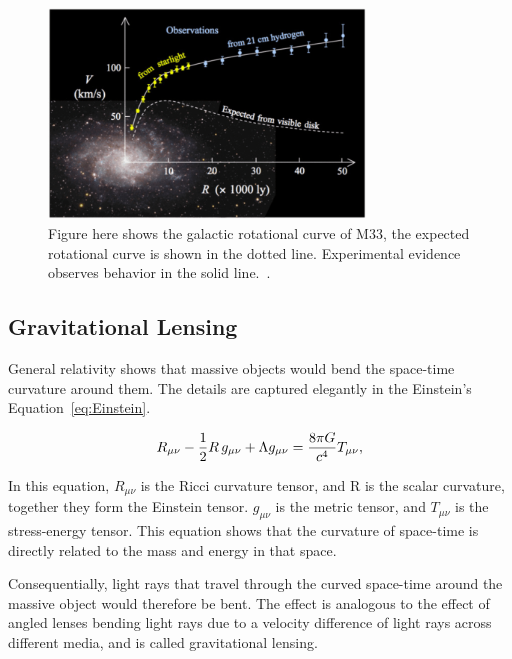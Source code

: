 \begin{figure}[!htb]
    \begin{center}
        \includegraphics[width=0.75\textwidth]{figures/chapter_DM/M33-rotation-curve}
        \caption{
            Figure here shows the galactic rotational curve of M33, the expected rotational curve is shown in the dotted line. Experimental evidence observes behavior in the solid line.~\cite{M33}.
        }
        \label{fig:M33_figure}
    \end{center}
\end{figure}

\subsection{Gravitational Lensing}
General relativity shows that massive objects would bend the space-time curvature around them. The details are captured elegantly in the Einstein's Equation~\ref{eq:Einstein}. 

\begin{equation}
	R_{\mu \nu} - {1 \over 2}R \, g_{\mu \nu} + \Lambda g_{\mu \nu}= {8 \pi G \over c^4} T_{\mu \nu}, 
    \label{eq:Einstein}
\end{equation}

	In this equation, $R_{\mu \nu}$ is the Ricci curvature tensor, and R is the scalar curvature, together they form the Einstein tensor. $g_{\mu \nu}$ is the metric tensor, and $T_{\mu \nu}$ is the stress-energy tensor. This equation shows that the curvature of space-time is directly related to the mass and energy in that space. 	
	
	Consequentially, light rays that travel through the curved space-time around the massive object would therefore be bent. The effect is analogous to the effect of angled lenses bending light rays due to a velocity difference of light rays across different media, and is called gravitational lensing. 

